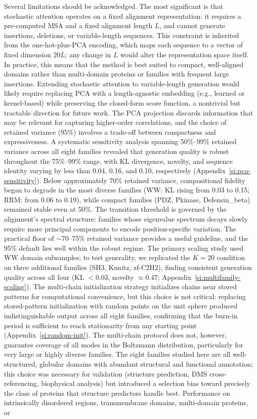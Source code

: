 Several limitations should be acknowledged. The most significant is that stochastic attention operates on a fixed alignment representation: it requires a pre-computed MSA and a fixed alignment length $L$, and cannot generate insertions, deletions, or variable-length sequences. This constraint is inherited from the one-hot-plus-PCA encoding, which maps each sequence to a vector of fixed dimension $20L$; any change in $L$ would alter the representation space itself. In practice, this means that the method is best suited to compact, well-aligned domains rather than multi-domain proteins or families with frequent large insertions. Extending stochastic attention to variable-length generation would likely require replacing PCA with a length-agnostic embedding (e.g., learned or kernel-based) while preserving the closed-form score function, a nontrivial but tractable direction for future work. The PCA projection discards information that may be relevant for capturing higher-order correlations, and the choice of retained variance (95\%) involves a trade-off between compactness and expressiveness. A systematic sensitivity analysis spanning 50\%--99\% retained variance across all eight families revealed that generation quality is robust throughout the 75\%--99\% range, with KL divergence, novelty, and sequence identity varying by less than 0.04, 0.16, and 0.10, respectively (Appendix~\ref{si:pca-sensitivity}). Below approximately 70\% retained variance, compositional fidelity began to degrade in the most diverse families (WW: KL rising from 0.03 to 0.15; RRM: from 0.06 to 0.19), while compact families (PDZ, Pkinase, Defensin\_beta) remained stable even at 50\%. The transition threshold is governed by the alignment's spectral structure: families whose eigenvalue spectrum decays slowly require more principal components to encode position-specific variation. The practical floor of ${\sim}70$--75\% retained variance provides a useful guideline, and the 95\% default lies well within the robust regime. The primary scaling study used WW domain subsamples; to test generality, we replicated the $K{=}20$ condition on three additional families (SH3, Kunitz, zf-C2H2), finding consistent generation quality across all four (KL $< 0.03$, novelty ${\approx}0.47$; Appendix~\ref{si:multifamily-scaling}). The multi-chain initialization strategy initializes chains near stored patterns for computational convenience, but this choice is not critical: replacing stored-pattern initialization with random points on the unit sphere produced indistinguishable output across all eight families, confirming that the burn-in period is sufficient to reach stationarity from any starting point (Appendix~\ref{si:random-init}). The multi-chain protocol does not, however, guarantee coverage of all modes in the Boltzmann distribution, particularly for very large or highly diverse families. The eight families studied here are all well-structured, globular domains with abundant structural and functional annotation; this choice was necessary for validation (structure prediction, DMS cross-referencing, biophysical analysis) but introduced a selection bias toward precisely the class of proteins that structure predictors handle best. Performance on intrinsically disordered regions, transmembrane domains, multi-domain proteins, or 